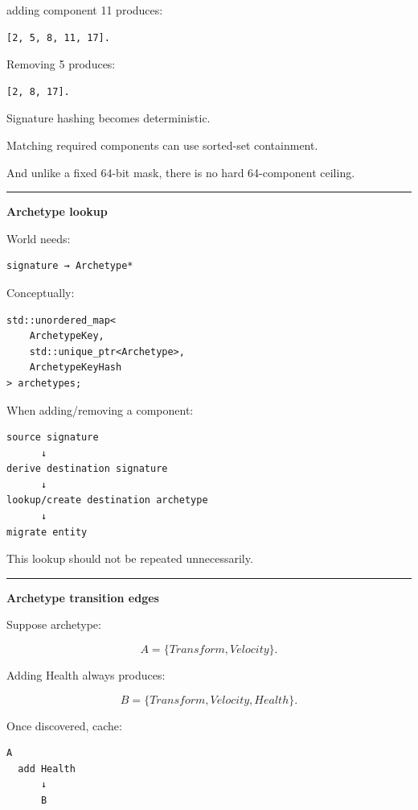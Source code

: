 adding component 11 produces:

\begin{verbatim}
[2, 5, 8, 11, 17].
\end{verbatim}

Removing 5 produces:

\begin{verbatim}
[2, 8, 17].
\end{verbatim}

Signature hashing becomes deterministic.

Matching required components can use sorted-set containment.

And unlike a fixed 64-bit mask, there is no hard 64-component ceiling.

\begin{center}\rule{0.5\linewidth}{0.5pt}\end{center}

\textbf{Archetype lookup}

World needs:

\begin{verbatim}
signature → Archetype*
\end{verbatim}

Conceptually:

\begin{verbatim}
std::unordered_map<
    ArchetypeKey,
    std::unique_ptr<Archetype>,
    ArchetypeKeyHash
> archetypes;
\end{verbatim}

When adding/removing a component:

\begin{verbatim}
source signature
      ↓
derive destination signature
      ↓
lookup/create destination archetype
      ↓
migrate entity
\end{verbatim}

This lookup should not be repeated unnecessarily.

\begin{center}\rule{0.5\linewidth}{0.5pt}\end{center}

\textbf{Archetype transition edges}

Suppose archetype:

\[
A=\{Transform,Velocity\}.
\]

Adding Health always produces:

\[
B=\{Transform,Velocity,Health\}.
\]

Once discovered, cache:

\begin{verbatim}
A
  add Health
      ↓
      B
\end{verbatim}

